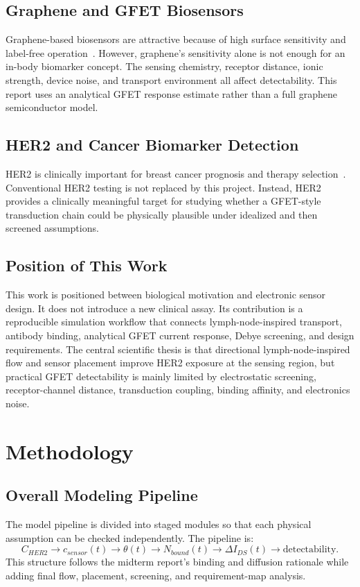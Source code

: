 ﻿\documentclass[12pt,a4paper,oneside]{report}
\begin{document}
\section{Graphene and GFET Biosensors}
Graphene-based biosensors are attractive because of high surface sensitivity and label-free operation~\cite{Ohno2010,Kuila2011,pena2018}. However, graphene's sensitivity alone is not enough for an in-body biomarker concept. The sensing chemistry, receptor distance, ionic strength, device noise, and transport environment all affect detectability. This report uses an analytical GFET response estimate rather than a full graphene semiconductor model.

\section{HER2 and Cancer Biomarker Detection}
HER2 is clinically important for breast cancer prognosis and therapy selection~\cite{Slamon1987,Wolff2018}. Conventional HER2 testing is not replaced by this project. Instead, HER2 provides a clinically meaningful target for studying whether a GFET-style transduction chain could be physically plausible under idealized and then screened assumptions.

\section{Position of This Work}
This work is positioned between biological motivation and electronic sensor design. It does not introduce a new clinical assay. Its contribution is a reproducible simulation workflow that connects lymph-node-inspired transport, antibody binding, analytical GFET current response, Debye screening, and design requirements. The central scientific thesis is that directional lymph-node-inspired flow and sensor placement improve HER2 exposure at the sensing region, but practical GFET detectability is mainly limited by electrostatic screening, receptor-channel distance, transduction coupling, binding affinity, and electronics noise.

\chapter{Methodology}

\section{Overall Modeling Pipeline}
The model pipeline is divided into staged modules so that each physical assumption can be checked independently. The pipeline is:
\[
C_{HER2}\rightarrow c_{sensor}(t)\rightarrow \theta(t)\rightarrow N_{bound}(t)\rightarrow \Delta I_{DS}(t)\rightarrow \text{detectability}.
\]
This structure follows the midterm report's binding and diffusion rationale while adding final flow, placement, screening, and requirement-map analysis.
\end{document}
